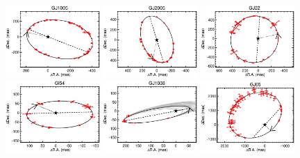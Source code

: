 \documentclass[twocolumn]{aastex62}
\begin{document}
\begin{figure}[htp]
\begin{center}
\includegraphics[width=0.32\textwidth]{Orbits/GJ1005AB.eps}
\includegraphics[width=0.32\textwidth]{Orbits/GJ2005AB.eps}
\includegraphics[width=0.32\textwidth]{Orbits/GJ22AB.eps}
\includegraphics[width=0.32\textwidth]{Orbits/Gl54AB.eps}
\includegraphics[width=0.32\textwidth]{Orbits/GJ1038AB.eps}
\includegraphics[width=0.32\textwidth]{Orbits/GJ65AB.eps}

\end{center}
\end{figure}
\end{document}
